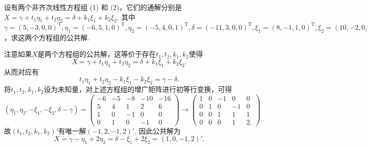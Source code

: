 \begin{exercise}
\begin{exgroup}
        \item 设有两个非齐次线性方程组 (1) 和 (2)，它们的通解分别是$X=\gamma+t_1\eta_1+t_2\eta_2=\delta+k_1\xi_1+k_2\xi_2$. 其中$\gamma=(5,-3,0,0)^\mathrm{T},\eta_1=(-6,5,1,0)^\mathrm{T},\eta_2=(-5,4,0,1)^\mathrm{T},\delta=(-11,3,0,0)^\mathrm{T},\xi_1=(8,-1,1,0)^\mathrm{T},\xi_2=(10,-2,0,1)^\mathrm{T}$，求这两个方程组的公共解.
        \begin{answer}
            注意如果$X$是两个方程组的公共解，这等价于存在$t_1,t_2,k_1,k_2$使得
          \[ X=\gamma+t_1\eta_1+t_2\eta_2=\delta+k_1\xi_1+k_2\xi_2. \]
          从而对应有
          \[ t_1\eta_1+t_2\eta_2-k_1\xi_1-k_2\xi_2=\gamma-\delta. \]
          将$t_1,t_2,k_1,k_2$设为未知量，对上述方程组的增广矩阵进行初等行变换，可得
          \[ (\eta_1,\eta_2,-\xi_1,-\xi_2,\delta-\gamma)=
              \begin{pmatrix}
                  -6 & -5 & -8 & -10 & -16 \\
                  5  & 4  & 1  & 2   & 6   \\
                  1  & 0  & -1 & 0   & 0   \\
                  0  & 1  & 0  & -1  & 0
              \end{pmatrix}\rightarrow
              \begin{pmatrix}
                  1 & 0 & -1 & 0  & 0  \\
                  0 & 1 & 0  & -1 & 0  \\
                  0 & 0 & 1  & 1  & 1  \\
                  0 & 0 & 0  & 1  & 2.
              \end{pmatrix} \]
          故$(t_1,t_2,k_1,k_2)'$有唯一解$(-1,2,-1,2)'$. 因此公共解为
          \[ X=\gamma-\eta_1+2\eta_2=\delta-\xi_1+2\xi_2=(1,0,-1,2)'. \]
        \end{answer}


\end{exgroup}
\end{exercise}
